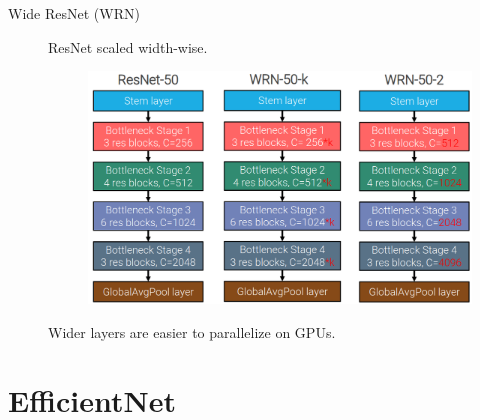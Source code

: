 \begin{description}
    \item[Wide ResNet (WRN)] 
        ResNet scaled width-wise.

        \begin{figure}[H]
            \centering
            \includegraphics[width=0.5\linewidth]{./img/wide_resnet.png}
        \end{figure}

        \begin{remark}
            Wider layers are easier to parallelize on GPUs.
        \end{remark}
\end{description}



\section{EfficientNet}

